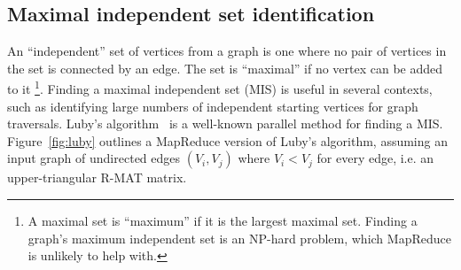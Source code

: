 \subsection{Maximal independent set identification}

An ``independent'' set of vertices from a graph is one where no pair
of vertices in the set is connected by an edge.  The set is
``maximal'' if no vertex can be added to it \footnote{A maximal set is
``maximum'' if it is the largest maximal set.  Finding a graph's
maximum independent set is an NP-hard problem, which MapReduce is
unlikely to help with.}.  Finding a maximal independent set (MIS) is
useful in several contexts, such as identifying large numbers of
independent starting vertices for graph traversals.  Luby's
algorithm~\cite{Luby86} is a well-known parallel method for finding a
MIS.  Figure~\ref{fig:luby} outlines a MapReduce version of Luby's
algorithm, assuming an input graph of undirected edges $(V_i,V_j)$
where $V_i < V_j$ for every edge, i.e. an upper-triangular R-MAT
matrix.

